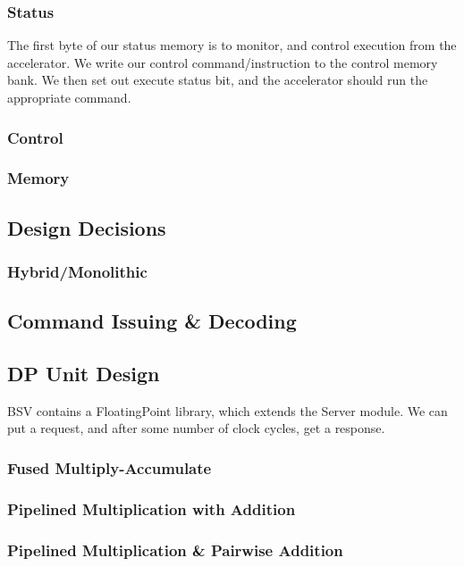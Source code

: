 \documentclass[a4paper,9pt]{report}
\begin{document}
\subsubsection{Status}
The first byte of our status memory is to monitor, and control execution from
the accelerator.
We write our control command/instruction to the control memory bank. We then set out
execute status bit, and the accelerator should run the appropriate command.

\subsubsection{Control}

\subsubsection{Memory}

\subsection{Design Decisions}
\subsubsection{Hybrid/Monolithic}

\subsection{Command Issuing \& Decoding}

\subsection{DP Unit Design} 
BSV contains a FloatingPoint library, which extends the Server module.
We can put a request, and after some number of clock cycles, get a response.

\subsubsection{Fused Multiply-Accumulate}


\subsubsection{Pipelined Multiplication with Addition}
\subsubsection{Pipelined Multiplication \& Pairwise Addition}
\end{document}
